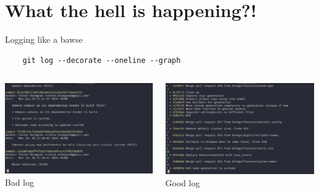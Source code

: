 \documentclass[10pt]{beamer}
\begin{document}
\section{What the hell is happening?!}
\begin{frame}[fragile]{Logging like a bawse}
  \begin{lstlisting}
    git log --decorate --oneline --graph
  \end{lstlisting}

  \begin{columns}[T] %
     \begin{column}[T]{.5\textwidth} %
       \includegraphics[width=\textwidth]{bad-log}
       Bad log
     \end{column}
     \begin{column}[T]{.5\textwidth} %
       \includegraphics[width=\textwidth]{good-log}
       Good log
     \end{column}
   \end{columns}
\end{frame}
\end{document}
